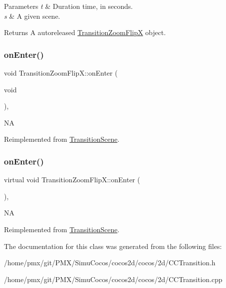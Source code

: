 \begin{DoxyParams}{Parameters}
{\em t} & Duration time, in seconds. \\
\hline
{\em s} & A given scene. \\
\hline
\end{DoxyParams}
\begin{DoxyReturn}{Returns}
A autoreleased \hyperlink{classTransitionZoomFlipX}{Transition\+Zoom\+FlipX} object. 
\end{DoxyReturn}
\mbox{\label{classTransitionZoomFlipX_a4a321886abfa6785e4a8b9e955791562}} 
\subsubsection{\texorpdfstring{on\+Enter()}{onEnter()}\hspace{0.1cm}{\footnotesize\ttfamily [1/2]}}
{\footnotesize\ttfamily void Transition\+Zoom\+Flip\+X\+::on\+Enter (\begin{DoxyParamCaption}\item[{void}]{ }\end{DoxyParamCaption})\hspace{0.3cm}{\ttfamily [override]}, {\ttfamily [virtual]}}

NA 

Reimplemented from \hyperlink{classTransitionScene_aace390a1bd8f3c73bb650a1e256a0f83}{Transition\+Scene}.

\mbox{\label{classTransitionZoomFlipX_a7f853a4b72233504d0947458408ac75c}} 
\subsubsection{\texorpdfstring{on\+Enter()}{onEnter()}\hspace{0.1cm}{\footnotesize\ttfamily [2/2]}}
{\footnotesize\ttfamily virtual void Transition\+Zoom\+Flip\+X\+::on\+Enter (\begin{DoxyParamCaption}{ }\end{DoxyParamCaption})\hspace{0.3cm}{\ttfamily [override]}, {\ttfamily [virtual]}}

NA 

Reimplemented from \hyperlink{classTransitionScene_aace390a1bd8f3c73bb650a1e256a0f83}{Transition\+Scene}.



The documentation for this class was generated from the following files\+:\begin{DoxyCompactItemize}
\item 
/home/pmx/git/\+P\+M\+X/\+Simu\+Cocos/cocos2d/cocos/2d/C\+C\+Transition.\+h\item 
/home/pmx/git/\+P\+M\+X/\+Simu\+Cocos/cocos2d/cocos/2d/C\+C\+Transition.\+cpp\end{DoxyCompactItemize}
